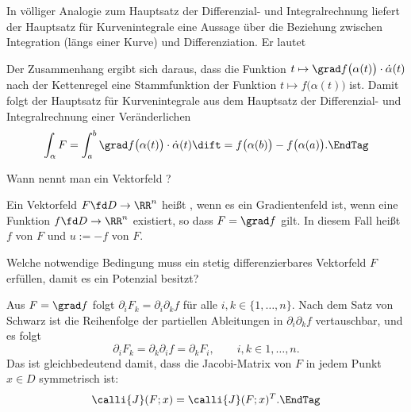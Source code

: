 \begin{antwort}
  In völliger Analogie zum Hauptsatz der Differenzial- und 
  Integralrechnung liefert der Hauptsatz für Kurvenintegrale eine Aussage 
  über die Beziehung zwischen Integration (längs einer Kurve) und 
  Differenziation. Er lautet 

  \medskip\noindent

  \medskip\noindent
  Der Zusammenhang ergibt sich daraus, dass die Funktion 
  $t\mapsto \grad f\big( \alpha(t) \big) \cdot\dot{\alpha}(t)$ 
  nach der Kettenregel eine Stammfunktion der Funktion 
  $t\mapsto f\big( \alpha(t) \big)$ ist. Damit folgt der Hauptsatz 
  für Kurvenintegrale aus dem Hauptsatz der Differenzial- und 
  Integralrechnung einer Veränderlichen
  \[
  \int_\alpha F  = 
  \int_a^b \grad f\big(\alpha(t)\big)\cdot\dot{\alpha}(t) \dift = 
  f \big( \alpha(b) \big)-f \big( \alpha(a) \big).\EndTag
  \]
\end{antwort}

\begin{frage}
  Wann nennt man ein Vektorfeld ?
\end{frage}

\begin{antwort}
  Ein Vektorfeld $F\fd D\to\RR^n$ heißt , 
  wenn es ein Gradientenfeld ist, {\dasheisst} wenn eine Funktion 
  $f\fd D\to\RR^n$ existiert, so dass $F=\grad f$ gilt. 
  In diesem Fall heißt $f$  von $F$  
  und $u:=-f$  von $F$.  
  \AntEnd  
\end{antwort} 

\begin{frage}\label{12_integrab}
  Welche notwendige Bedingung muss ein stetig 
  differenzierbares Vektorfeld $F$ erfüllen, damit es 
  ein Potenzial besitzt? 
\end{frage}

\begin{antwort}
  Aus $F=\grad f$ folgt  
  $\partial_i F_k = \partial_i \partial_k f$ für alle 
  $i,k \in\{1,\ldots,n\}$.  
  Nach dem Satz von Schwarz ist die Reihenfolge der 
  partiellen Ableitungen in $\partial_i \partial_k f$ 
  vertauschbar, und es folgt
  \[
  \partial_i F_k = \partial_k \partial_i f = \partial_k F_i, 
  \qquad i,k \in{1,\ldots,n}.
  \]
  Das ist gleichbedeutend damit, dass die Jacobi-Matrix 
  von $F$ in jedem Punkt $x\in D$ symmetrisch ist: 
  \[
  \calli{J}(F;x)=\calli{J}(F;x)^T.\EndTag
  \] 
\end{antwort}

